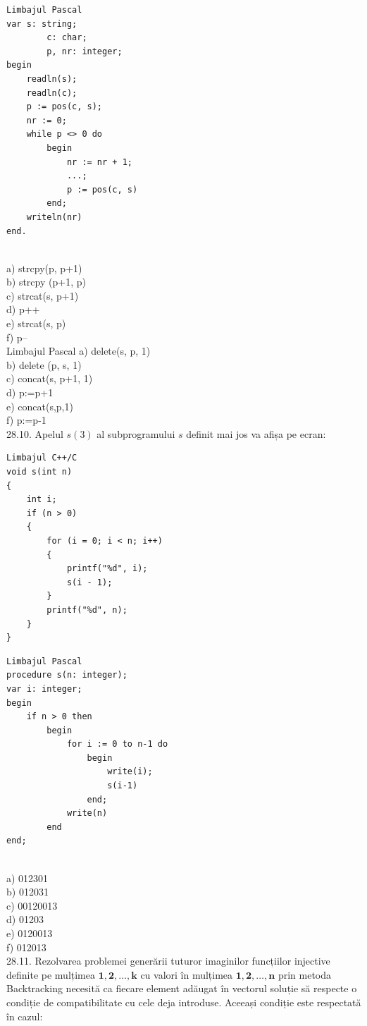 \begin{verbatim}
Limbajul Pascal
var s: string;
        c: char;
        p, nr: integer;
begin
    readln(s);
    readln(c);
    p := pos(c, s);
    nr := 0;
    while p <> 0 do
        begin
            nr := nr + 1;
            ...;
            p := pos(c, s)
        end;
    writeln(nr)
end.
\end{verbatim}
\\
a) strcpy(p, p+1)
\\
b) strcpy (p+1, p)
\\
c) strcat(s, p+1)
\\
d) p++
\\
e) strcat(s, p)
\\
f) p--
\\
Limbajul Pascal
a) delete(s, p, 1)
\\
b) delete (p, s, 1)
\\
c) concat(s, p+1, 1)
\\
d) p:=p+1
\\
e) concat(s,p,1)
\\
f) p:=p-1
\\
28.10. Apelul $s(3)$ al subprogramului $s$ definit mai jos va afișa pe ecran:
\begin{verbatim}
Limbajul C++/C
void s(int n)
{
    int i;
    if (n > 0)
    {
        for (i = 0; i < n; i++)
        {
            printf("%d", i);
            s(i - 1);
        }
        printf("%d", n);
    }
}
\end{verbatim}
\begin{verbatim}
Limbajul Pascal
procedure s(n: integer);
var i: integer;
begin
    if n > 0 then
        begin
            for i := 0 to n-1 do
                begin
                    write(i);
                    s(i-1)
                end;
            write(n)
        end
end;
\end{verbatim}
\\
a) 012301
\\
b) 012031
\\
c) 00120013
\\
d) 01203
\\
e) 0120013
\\
f) 012013
\\
28.11. Rezolvarea problemei generării tuturor imaginilor funcțiilor injective definite pe mulțimea ${\mathbf{1}, \mathbf{2}, \ldots, \mathbf{k}}$ cu valori în mulțimea ${\mathbf{1}, \mathbf{2}, \ldots, \mathbf{n}}$ prin metoda Backtracking necesită ca fiecare element adăugat în vectorul soluție să respecte o condiție de compatibilitate cu cele deja introduse. Aceeași condiție este respectată în cazul:
